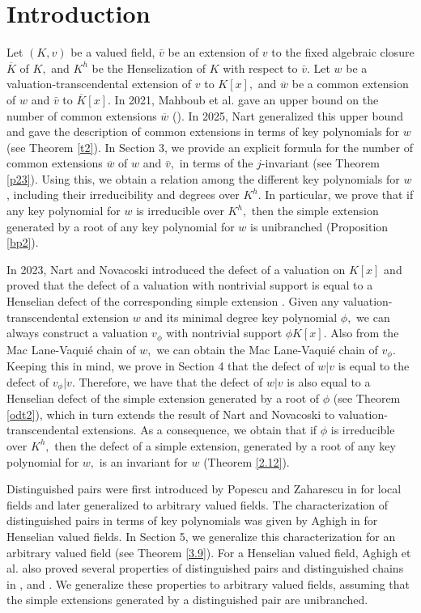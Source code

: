 \documentclass[11pt]{amsart}
\theoremstyle{definition}
\theoremstyle{remark}
\numberwithin{equation}{section}
\begin{document}
	\section{Introduction}
Let $(K,v)$ be a valued field, $\bar{v}$ be an extension of $v$ to the fixed algebraic closure $\overline{K}$ of $K,$ and $K^h$ be the Henselization of $K$ with respect to $\bar{v}.$ Let $w$ be a valuation-transcendental extension of $v$ to $K[x],$ and $\overline{w}$ be a common extension of $w$ and $\bar{v}$ to $\overline{K}[x].$ In 2021, Mahboub et al. gave an upper bound on the number of common extensions $\overline{w}$ (\cite[Corollary 5.7]{W}). In 2025, Nart generalized this upper bound and gave the description of common extensions in terms of key polynomials for $w$ (see Theorem \ref{t2}). In Section 3, we provide an explicit formula for the number of common extensions $\overline{w}$ of $w$ and $\bar{v},$ in terms of the $j$-invariant (see Theorem \ref{p23}). Using this, we obtain a relation among the different key polynomials for $w$, including their irreducibility and degrees over $ K^h.$ In particular, we prove that if any key polynomial for $w$ is irreducible over $K^h,$ then the simple extension generated by a root of any key polynomial for $w$ is unibranched (Proposition \ref{bp2}).
	
	In 2023, Nart and Novacoski introduced the defect of a valuation on $K[x]$ and proved that the defect of a valuation with nontrivial support is equal to a Henselian defect of the corresponding simple extension \cite[Theorem 6.14]{EN3}. Given any valuation-transcendental extension $w$ and its minimal degree key polynomial $\phi,$ we can always construct a valuation $v_\phi$ with nontrivial support $\phi K[x].$ Also from the Mac Lane-Vaqui\'e chain of $w,$ we can obtain the Mac Lane-Vaqui\'e chain of $v_\phi.$ Keeping this in mind, we prove in Section 4 that the defect of $w|v$ is equal to the defect of $v_\phi|v.$ Therefore, we have that the defect of $w|v$ is also equal to a Henselian defect of the simple extension generated by a root of $\phi$ (see Theorem \ref{odt2}), which in turn extends the result of Nart and Novacoski to valuation-transcendental extensions. As a consequence, we obtain that if $\phi$ is irreducible over $K^h,$ then the defect of a simple extension, generated by a root of any key polynomial for $w,$ is an invariant for $w$ (Theorem \ref{2.12}).
	
	Distinguished pairs were first introduced by Popescu and Zaharescu in \cite{PZ} for local fields and later generalized to arbitrary valued fields. The characterization of distinguished pairs in terms of key polynomials was given by Aghigh in \cite{AN1} for Henselian valued fields. In Section 5, we generalize this characterization for an arbitrary valued field (see Theorem \ref{3.9}). For a Henselian valued field, Aghigh et al. also proved several properties of distinguished pairs and distinguished chains in \cite{AK2}, \cite{AN1} and \cite{AN2}. We generalize these properties to arbitrary valued fields, assuming that the simple extensions generated by a distinguished pair are unibranched.
	
\end{document}
